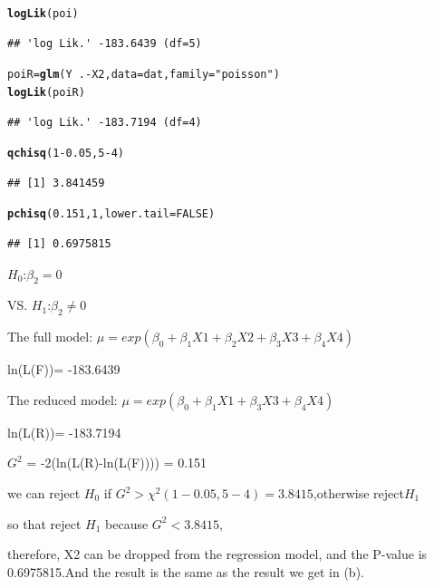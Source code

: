 \documentclass{article}\usepackage[]{graphicx}\usepackage[]{color}
\makeatletter
\newcommand{\hlnum}[1]{\textcolor[rgb]{0.686,0.059,0.569}{#1}}%
\newcommand{\hlstr}[1]{\textcolor[rgb]{0.192,0.494,0.8}{#1}}%
\newcommand{\hlopt}[1]{\textcolor[rgb]{0,0,0}{#1}}%
\newcommand{\hlstd}[1]{\textcolor[rgb]{0.345,0.345,0.345}{#1}}%
\newcommand{\hlkwb}[1]{\textcolor[rgb]{0.69,0.353,0.396}{#1}}%
\newcommand{\hlkwc}[1]{\textcolor[rgb]{0.333,0.667,0.333}{#1}}%
\newcommand{\hlkwd}[1]{\textcolor[rgb]{0.737,0.353,0.396}{\textbf{#1}}}%
\newenvironment{kframe}{%
 \def\at@end@of@kframe{}%
 \ifinner\ifhmode%
  \def\at@end@of@kframe{\end{minipage}}%
  \begin{minipage}{\columnwidth}%
 \fi\fi%
 \def\FrameCommand##1{\hskip\@totalleftmargin \hskip-\fboxsep
 \colorbox{shadecolor}{##1}\hskip-\fboxsep
     \hskip-\linewidth \hskip-\@totalleftmargin \hskip\columnwidth}%
 \MakeFramed {\advance\hsize-\width
   \@totalleftmargin\z@ \linewidth\hsize
   \@setminipage}}%
 {\par\unskip\endMakeFramed%
 \at@end@of@kframe}
\newenvironment{knitrout}{}{} %
\makeatother
\begin{document}
\begin{enumerate}[(a)]
\begin{knitrout}
\color{fgcolor}\begin{kframe}
\begin{alltt}
  \hlkwd{logLik}\hlstd{(poi)}
\end{alltt}
\begin{verbatim}
## 'log Lik.' -183.6439 (df=5)
\end{verbatim}
\begin{alltt}
  \hlstd{poiR} \hlkwb{=} \hlkwd{glm}\hlstd{(Y} \hlopt{~} \hlstd{.}\hlopt{-}\hlstd{X2 ,} \hlkwc{data} \hlstd{= dat,} \hlkwc{family} \hlstd{=} \hlstr{"poisson"}\hlstd{)}
  \hlkwd{logLik}\hlstd{(poiR)}
\end{alltt}
\begin{verbatim}
## 'log Lik.' -183.7194 (df=4)
\end{verbatim}
\begin{alltt}
  \hlkwd{qchisq}\hlstd{(}\hlnum{1}\hlopt{-}\hlnum{0.05}\hlstd{,} \hlnum{5}\hlopt{-}\hlnum{4}\hlstd{)}
\end{alltt}
\begin{verbatim}
## [1] 3.841459
\end{verbatim}
\begin{alltt}
  \hlkwd{pchisq}\hlstd{(}\hlnum{0.151}\hlstd{,} \hlnum{1}\hlstd{,} \hlkwc{lower.tail} \hlstd{=} \hlnum{FALSE}\hlstd{)}
\end{alltt}
\begin{verbatim}
## [1] 0.6975815
\end{verbatim}
\end{kframe}
\end{knitrout}

\begin{center}
$H_0$:$\beta_2=0$

VS. $H_1$:$\beta_2 \ne 0$

The full model: $\mu = exp(\beta_0 + \beta_1 X1 + \beta_2 X2 + \beta_3 X3 + \beta_4 X4) $

ln(L(F))= -183.6439

The reduced model: $\mu = exp(\beta_0 + \beta_1 X1 + \beta_3 X3 + \beta_4 X4) $

ln(L(R))= -183.7194

$G^2$ = -2(ln(L(R)-ln(L(F)))) = 0.151

we can reject $H_0$ if $G^2 > \chi^2(1-0.05, 5-4)=3.8415$,otherwise reject$H_1$

so that reject $H_1$ because $G^2 < 3.8415$,

therefore, X2 can be dropped from the regression model, and the P-value is 0.6975815.And the result is the same as the result we get in (b).
\end{center}


\end{enumerate}
\end{document}
